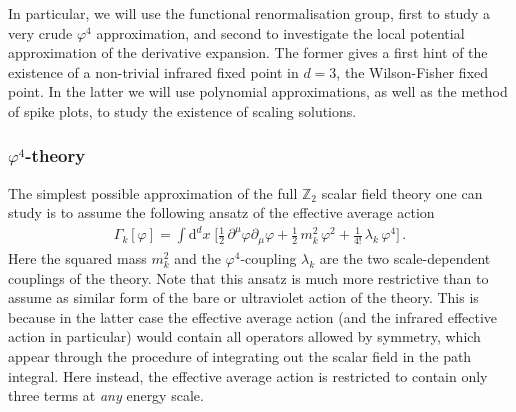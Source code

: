 \documentclass[11pt]{book}
\numberwithin{equation}{chapter}
\begin{document}
In particular, we will
use the functional renormalisation group, first to
study a very crude $\varphi^4$ approximation, and
second to investigate the local potential approximation
of the derivative expansion. The former gives a first
hint of the existence of a non-trivial infrared fixed point
in $d=3$, the Wilson-Fisher fixed point. In the latter
we will use polynomial approximations, as well
as the method of spike plots, to study the existence of
scaling solutions.

\subsubsection{$\varphi^4$-theory}

The simplest possible approximation of the full $\mathbb Z_2$
scalar field theory one can study is to assume the following
ansatz of the effective average action
\begin{align}
  \Gamma_k [\varphi] = \int \mathrm d^dx \;
  \bigg[
  \frac 12 \, \partial^\mu \varphi \partial_\mu \varphi
  + \frac 12 \, m_k^2 \, \varphi^2
  + \frac {1}{4!} \, \lambda_k \, \varphi^4
  \bigg] \,.
\end{align}
Here the squared mass $m_k^2$ and the $\varphi^4$-coupling
$\lambda_k$ are the two scale-dependent couplings of the
theory.
Note that this ansatz is much more restrictive than to assume
as similar form of the bare or ultraviolet action of the theory.
This is because in the latter case the effective average action
(and the infrared effective action in particular) would contain
all operators allowed by symmetry, which appear through the procedure
of integrating out the scalar field in the path integral. Here instead,
the effective average action is restricted to contain only three
terms at \textit{any} energy scale.
\end{document}
